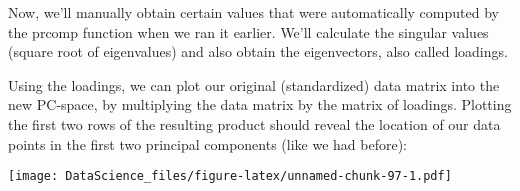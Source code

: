 \documentclass[
]{book}
\newenvironment{Shaded}{\begin{snugshade}}{\end{snugshade}}
\newcommand{\AttributeTok}[1]{\textcolor[rgb]{0.77,0.63,0.00}{#1}}
\newcommand{\FunctionTok}[1]{\textcolor[rgb]{0.00,0.00,0.00}{#1}}
\newcommand{\NormalTok}[1]{#1}
\newcommand{\OtherTok}[1]{\textcolor[rgb]{0.56,0.35,0.01}{#1}}
\newcommand{\SpecialCharTok}[1]{\textcolor[rgb]{0.00,0.00,0.00}{#1}}
\newcommand{\StringTok}[1]{\textcolor[rgb]{0.31,0.60,0.02}{#1}}
\begin{document}
Now, we'll manually obtain certain values that were automatically computed by the prcomp function when we ran it earlier. We'll calculate the singular values (square root of eigenvalues) and also obtain the eigenvectors, also called loadings.

\begin{Shaded}
\end{Shaded}

Using the loadings, we can plot our original (standardized) data matrix into the new PC-space, by multiplying the data matrix by the matrix of loadings. Plotting the first two rows of the resulting product should reveal the location of our data points in the first two principal components (like we had before):

\begin{Shaded}
\end{Shaded}

\texttt{[image: DataScience\_files/figure-latex/unnamed-chunk-97-1.pdf]}
\end{document}
